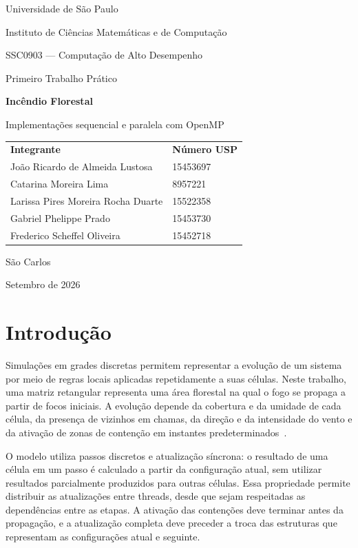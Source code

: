 \documentclass[12pt,a4paper]{article}
\begin{document}
\begin{titlepage}
\centering
{\large Universidade de São Paulo\par}
{\large Instituto de Ciências Matemáticas e de Computação\par}
\vspace{1cm}
{\large SSC0903 --- Computação de Alto Desempenho\par}
{\large Primeiro Trabalho Prático\par}
\vfill
{\LARGE\bfseries Incêndio Florestal\par}
\vspace{0.5cm}
{\Large Implementações sequencial e paralela com OpenMP\par}
\vfill
\begin{tabular}{ll}
\textbf{Integrante} & \textbf{Número USP} \\
João Ricardo de Almeida Lustosa & 15453697 \\
Catarina Moreira Lima & 8957221 \\
Larissa Pires Moreira Rocha Duarte & 15522358 \\
Gabriel Phelippe Prado & 15453730 \\
Frederico Scheffel Oliveira & 15452718\\
\end{tabular}
\vfill
São Carlos\par
Setembro de 2026
\end{titlepage}
\tableofcontents
\newpage

\section{Introdução}

Simulações em grades discretas permitem representar a evolução de um sistema
por meio de regras locais aplicadas repetidamente a suas células. Neste
trabalho, uma matriz retangular representa uma área florestal na qual o fogo
se propaga a partir de focos iniciais. A evolução depende da cobertura e da
umidade de cada célula, da presença de vizinhos em chamas, da direção e da
intensidade do vento e da ativação de zonas de contenção em instantes
predeterminados~\cite{enunciado}.

O modelo utiliza passos discretos e atualização síncrona: o resultado de uma
célula em um passo é calculado a partir da configuração atual, sem utilizar
resultados parcialmente produzidos para outras células. Essa propriedade
permite distribuir as atualizações entre threads, desde que sejam respeitadas
as dependências entre as etapas. A ativação das contenções deve terminar
antes da propagação, e a atualização completa deve preceder a troca das
estruturas que representam as configurações atual e seguinte.
\end{document}
